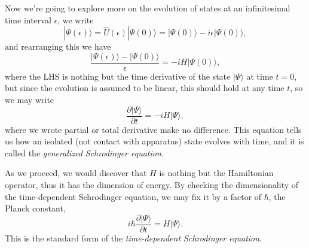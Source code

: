 \documentclass{article}
\newcommand{\be}{\begin{equation}}
\newcommand{\ee}{\end{equation}}
\newcommand{\p}{\partial}
\newcommand{\1}{\left}
\newcommand{\2}{\right}
\newcommand{\ke}{\rangle}
\newcommand{\ep}{\epsilon}
\begin{document}
Now we're going to explore more on the evolution of states at an infinitesimal time interval $\epsilon$, we write
\be
|\Psi(\ep)\ke=\hat U(\ep) |\Psi(0)\ke = |\Psi(0)\ke-i\ep|\Psi(0)\ke,
\ee
and rearranging this we have
\be
\frac{|\Psi(\ep)\ke-|\Psi(0)\ke}{\ep}=-iH|\Psi(0)\ke,
\ee
where the LHS is nothing but the time derivative of the state $|\Psi\ke$ at time $t=0$, but since the evolution is assumed to be linear, this should hold at any time $t$, so we may write
\be
\frac{\p |\Psi\ke}{\p t}=-i H|\Psi\ke,
\ee
where we wrote partial or total derivative make no difference. This equation tells us how an isolated (not contact with apparatus) state evolves with time, and it is called the \textit{generalized Schrodinger equation}.

As we proceed, we would discover that $H$ is nothing but the Hamiltonian operator, thus it has the dimension of energy. By checking the dimensionality of the time-dependent Schrodinger equation, we may fix it by a factor of $\hbar$, the Planck constant,
\be
i\hbar\frac{\p |\Psi\ke}{\p t}= H|\Psi\ke.
\ee
This is the standard form of the \textit{time-dependent Schrodinger equation}.\\
\end{document}
